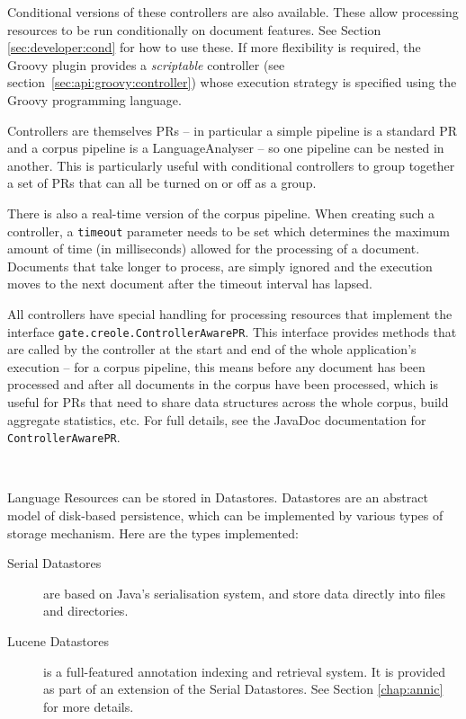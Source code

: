 Conditional versions of these controllers are also available. These allow
processing resources to be run conditionally on document features. 
See Section \ref{sec:developer:cond} for how to use these.  If more flexibility
is required, the Groovy plugin provides a \emph{scriptable} controller (see
section~\ref{sec:api:groovy:controller}) whose execution strategy is specified
using the Groovy programming language.

Controllers are themselves PRs -- in particular a simple pipeline is a standard
PR and a corpus pipeline is a LanguageAnalyser -- so one pipeline can be nested
in another.  This is particularly useful with conditional controllers to group
together a set of PRs that can all be turned on or off as a group.

There is also a real-time version of the corpus pipeline. When creating such
a controller, a {\tt timeout} parameter needs to be set which determines the
maximum amount of time (in milliseconds) allowed for the processing of a
document. Documents that take longer to process, are simply ignored and the
execution moves to the next document after the timeout interval has lapsed.

All controllers have special handling for processing resources that implement
the interface \texttt{gate.creole.ControllerAwarePR}.  This interface provides
methods that are called by the controller at the start and end of the whole
application's execution -- for a corpus pipeline, this means before any
document has been processed and after all documents in the corpus have been
processed, which is useful for PRs that need to share data structures across
the whole corpus, build aggregate statistics, etc.  For full details, see the
JavaDoc documentation for \texttt{ControllerAwarePR}.
%



\mbox{ }

Language Resources can be stored in Datastores. Datastores are an abstract
model of disk-based persistence, which can be implemented by various types of
storage mechanism. Here are the types implemented:
%
\begin{description}
%
\item[Serial Datastores] are based on Java's serialisation system, and store
data directly into files and directories.
%
\item[Lucene Datastores] is a full-featured annotation indexing and
retrieval system. It is provided as part of an extension of the Serial
Datastores. See Section \ref{chap:annic} for more details.
%
%
\end{description}

